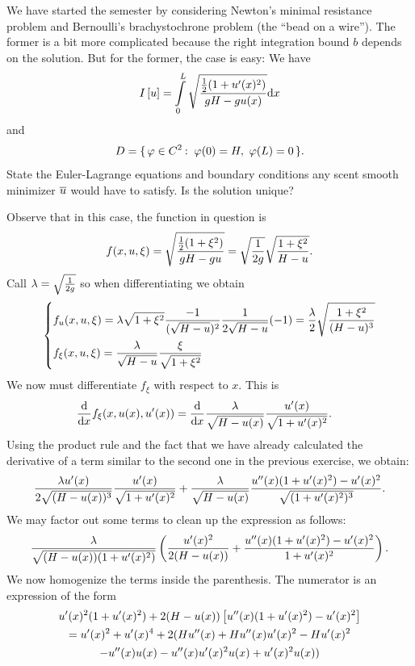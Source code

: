 \documentclass[12pt]{memoir}
\begin{document}
\begin{Ej}
    We have started the semester by considering Newton's
    minimal resistance problem and Bernoulli's brachystochrone problem (the ``bead on a wire''). The former is
    a bit more complicated because the right integration bound $ b$ depends on the solution. But for the former,
    the case is easy: We have
    $$I\bonj{u}=\int\limits_0^L\sqrt{\frac{\half(1+u'(x)^2)}{gH-gu(x)}}\dd x$$
    and
    $$D=\set{\vf\in C^2\:\ \vf(0)=H,\ \vf(L)=0}.$$
    State the Euler-Lagrange equations and boundary conditions any scent smooth minimizer $\overline u$ would
have to satisfy. Is the solution unique?
\end{Ej}

\begin{ptcbr}
Observe that in this case, the function in question is 
$$f(x,u,\xi)=\sqrt{\frac{\half(1+\xi^2)}{gH-gu}}=\sqrt{\frac{1}{2g}}\sqrt{\frac{1+\xi^2}{H-u}}.$$
Call $\lambda=\sqrt{\frac{1}{2g}}$ so when differentiating we obtain 
$$\left\lbrace
\begin{aligned}
    &f_u(x,u,\xi)=\lambda\sqrt{1+\xi^2}\frac{-1}{(\sqrt{H-u})^2}\frac{1}{2\sqrt{H-u}}(-1)=\frac{\lambda}{2}\sqrt{\frac{1+\xi^2}{(H-u)^3}}\\
    &f_\xi(x,u,\xi)=\frac{\lambda}{\sqrt{H-u}}\frac{\xi}{\sqrt{1+\xi^2}}
\end{aligned}
\right.
$$
We now must differentiate $f_\xi$ with respect to $x$. This is 
\begin{align*}
    \dv{x}f_{\xi}(x,u(x),u'(x))&=\dv{x}\frac{\lambda}{\sqrt{H-u(x)}}\frac{u'(x)}{\sqrt{1+u'(x)^2}}.
\end{align*}
Using the product rule and the fact that we have already calculated the derivative of a term similar to the second one in the previous exercise, we obtain:
$$\frac{\lambda u'(x)}{2\sqrt{(H-u(x))^3}}\frac{u'(x)}{\sqrt{1+u'(x)^2}}+\frac{\lambda}{\sqrt{H-u(x)}}\frac{u''(x)(1+u'(x)^2)-u'(x)^2}{\sqrt{(1+u'(x)^2)^3}}.$$
We may factor out some terms to clean up the expression as follows:
$$\frac{\lambda}{\sqrt{(H-u(x))(1+u'(x)^2)}}\left(\frac{u'(x)^2}{2(H-u(x))}+\frac{u''(x)(1+u'(x)^2)-u'(x)^2}{1+u'(x)^2}\right).$$
We now homogenize the terms inside the parenthesis. The numerator is an expression of the form 
\begin{gather*}
u'(x)^2(1+u'(x)^2)+2(H-u(x))\left\lbrack u''(x)(1+u'(x)^2)-u'(x)^2\right\rbrack\\
=u'(x)^2+u'(x)^4+2(Hu''(x)+Hu''(x)u'(x)^2-Hu'(x)^2\\
-u''(x)u(x)-u''(x)u'(x)^2u(x)+u'(x)^2u(x))
\end{gather*}

\end{ptcbr}
\end{document}
